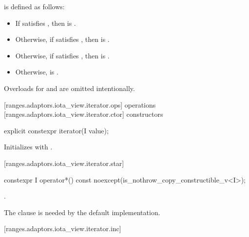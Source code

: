 \pnum
{} is defined as follows:
\begin{itemize}
\item If  satisfies , then
 is .
\item Otherwise, if  satisfies , then
 is .
\item Otherwise, if  satisfies , then
 is .
\item Otherwise,  is .
\end{itemize}

\pnum
\enternote Overloads for  and  are omitted
intentionally.\exitnote

[ranges.adaptors.iota_view.iterator.ops]{ operations}
[ranges.adaptors.iota_view.iterator.ctor]{ constructors}

\begin{itemdecl}
explicit constexpr iterator(I value);
\end{itemdecl}

\begin{itemdescr}
\pnum
\effects Initializes  with .
\end{itemdescr}

[ranges.adaptors.iota_view.iterator.star]{}

\begin{itemdecl}
constexpr I operator*() const noexcept(is_nothrow_copy_constructible_v<I>);
\end{itemdecl}

\begin{itemdescr}
\pnum
\returns {}.

\pnum
\enternote The  clause is needed by the default 
implementation.\exitnote
\end{itemdescr}

[ranges.adaptors.iota_view.iterator.inc]{}

